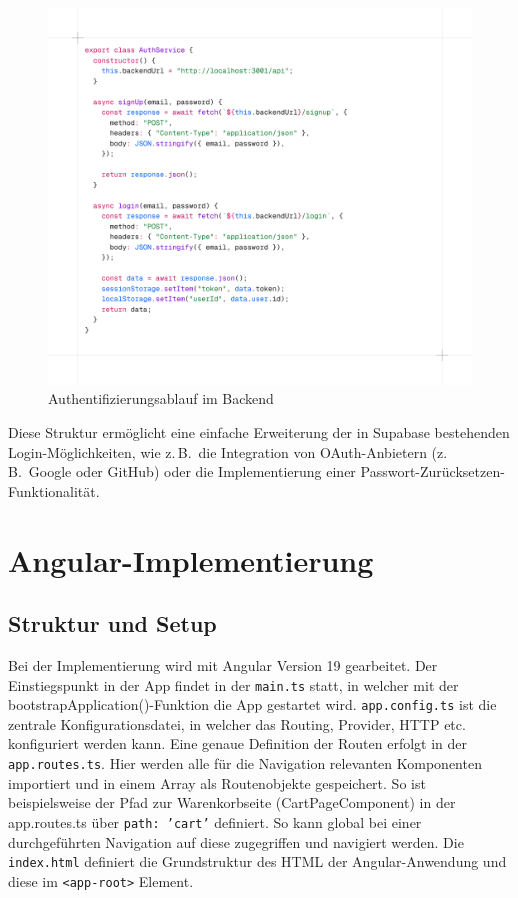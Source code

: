 \documentclass[oneside]{ausarbeitung}
\begin{document}
\begin{figure}[h!]
    \centering
    \includegraphics[width=\linewidth]{images/auth.png}
    \caption{Authentifizierungsablauf im Backend}
    \label{fig:auth}
\end{figure}


Diese Struktur ermöglicht eine einfache Erweiterung der in Supabase bestehenden Login-Möglichkeiten, wie z.\,B.\ die Integration von OAuth-Anbietern (z.\,B.\ Google oder GitHub) oder die Implementierung einer Passwort-Zurücksetzen-Funktionalität.

\section{Angular-Implementierung}
\subsection{Struktur und Setup}

Bei der Implementierung wird mit Angular Version 19 gearbeitet. Der Einstiegspunkt in der App findet in der \texttt{main.ts} statt, in welcher mit der bootstrapApplication()-Funktion die App gestartet wird. \texttt{app.config.ts} ist die zentrale Konfigurationsdatei, in welcher das Routing, Provider, \ac{HTTP} etc. konfiguriert werden kann. Eine genaue Definition der Routen erfolgt in der \texttt{app.routes.ts}. Hier werden alle für die Navigation relevanten Komponenten importiert und in einem Array als Routenobjekte gespeichert. So ist beispielsweise der Pfad zur Warenkorbseite (CartPageComponent) in der app.routes.ts über \texttt{path: 'cart'} definiert. So kann global bei einer durchgeführten Navigation auf diese zugegriffen und navigiert werden. Die \texttt{index.html} definiert die Grundstruktur des \ac{HTML} der Angular-Anwendung und diese im \texttt{<app-root>} Element.
\end{document}
